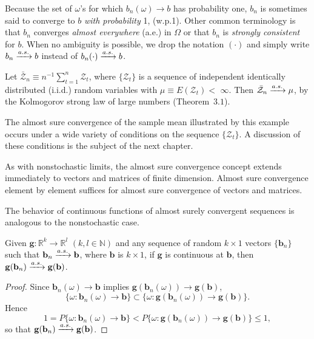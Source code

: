 Because the set of $\omega$'s for which $b_n(\omega) \to b$ has probability one, $b_n$ is
sometimes said to converge to $b$ \emph{with probability} 1, (w.p.1). Other common
terminology is that $b_n$ converges \emph{almost everywhere} (a.e.) in $\Omega$ or that $b_n$
is \emph{strongly consistent} for $b$. When no ambiguity is possible, we drop the
notation $(\cdot)$ and simply write $b_n \xrightarrow{a.s.} b$ instead of $b_n(\cdot) \xrightarrow{a.s.} b$.

\begin{example}\label{ex:slln}
Let $\bar{\mathcal{Z}}_n \equiv n^{-1}\sum_{t=1}^n \mathcal{Z}_t$, where $\{\mathcal{Z}_t\}$ is a sequence of independent identically distributed (i.i.d.) random variables with $\mu \equiv E(\mathcal{Z}_t) <$
$\infty$. Then $\bar{\mathcal{Z}}_n \xrightarrow{a.s.} \mu$, by the Kolmogorov strong law of large numbers (Theorem~$3.1$).
\end{example}

The almost sure convergence of the sample mean illustrated by this example occurs under a wide variety of conditions on the sequence $\{\mathcal{Z}_t\}$. A
discussion of these conditions is the subject of the next chapter.

As with nonstochastic limits, the almost sure convergence concept extends immediately to vectors and matrices of finite dimension. Almost sure
convergence element by element suffices for almost sure convergence of vectors and matrices.

The behavior of continuous functions of almost surely convergent sequences is analogous to the nonstochastic case.

\begin{proposition}\label{prop:cmt-as}
Given $\mathbf{g} : \mathbb{R}^k \to \mathbb{R}^l$ $(k, l \in \mathbb{N})$ and any sequence of
random $k \times 1$ vectors $\{\mathbf{b}_n\}$ such that $\mathbf{b}_n \xrightarrow{a.s.} \mathbf{b}$, where $\mathbf{b}$ is $k \times 1$, if $\mathbf{g}$ is
continuous at $\mathbf{b}$, then $\mathbf{g}(\mathbf{b}_n) \xrightarrow{a.s.} \mathbf{g}(\mathbf{b})$.
\end{proposition}

\begin{proof}
Since $\mathbf{b}_n(\omega) \to \mathbf{b}$ implies $\mathbf{g}(\mathbf{b}_n(\omega)) \to \mathbf{g}(\mathbf{b})$,
\[
\{\omega : \mathbf{b}_n(\omega) \to \mathbf{b}\} \subset \{\omega : \mathbf{g}(\mathbf{b}_n(\omega)) \to \mathbf{g}(\mathbf{b})\}.
\]
Hence
\[
1 = P\{\omega : \mathbf{b}_n(\omega) \to \mathbf{b}\} < P\{\omega : \mathbf{g}(\mathbf{b}_n(\omega)) \to \mathbf{g}(\mathbf{b})\} \leq 1,
\]
so that $\mathbf{g}(\mathbf{b}_n) \xrightarrow{a.s.} \mathbf{g}(\mathbf{b})$.
\end{proof}

